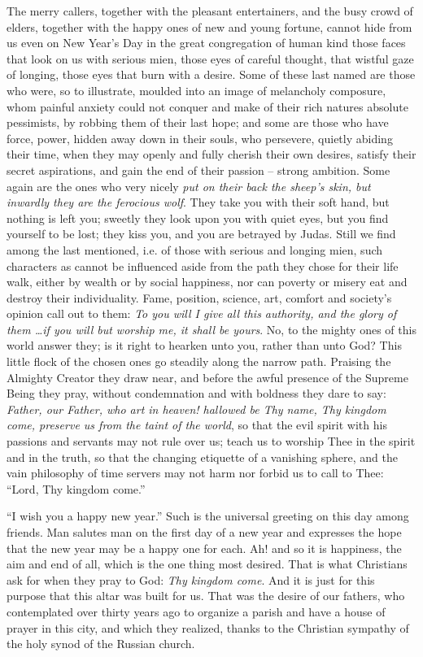 The merry callers, together with the pleasant 
entertainers, and the busy crowd of elders, together
with the happy ones of new and young 
fortune, cannot hide from us even on New 
Year's Day in the great congregation of human 
kind those faces that look on us with serious 
mien, those eyes of careful thought, that wistful
gaze of longing, those eyes that burn with 
a desire. Some of these last named are those 
who were, so to illustrate, moulded into an 
image of melancholy composure, whom painful 
anxiety could not conquer and make of their 
rich natures absolute pessimists, by robbing 
them of their last hope; and some are those 
who have force, power, hidden away down in 
their souls, who persevere, quietly abiding their 
time, when they may openly and fully cherish 
their own desires, satisfy their secret aspirations,
and gain the end of their passion -- strong 
ambition. Some again are the ones who very 
nicely \textit{put on their back the sheep's skin, but 
inwardly they are the ferocious wolf}. They take 
you with their soft hand, but nothing is left 
you; sweetly they look upon you with quiet 
eyes, but you find yourself to be lost; they kiss 
you, and you are betrayed by Judas. Still we 
find among the last mentioned, i.e. of those 
with serious and longing mien, such characters 
as cannot be influenced aside from the path they 
chose for their life walk, either by wealth or by 
social happiness, nor can poverty or misery eat 
and destroy their individuality. Fame, position, 
science, art, comfort and society's opinion call 
out to them: \textit{To you will I give all this authority,
and the glory of them \ldots if you will
but worship me, it shall be yours}. No, to the 
mighty ones of this world answer they; is it 
right to hearken unto you, rather than unto 
God? This little flock of the chosen ones go 
steadily along the narrow path. Praising the 
Almighty Creator they draw near, and before 
the awful presence of the Supreme Being they 
pray, without condemnation and with boldness 
they dare to say: \textit{Father, our Father, who art 
in heaven! hallowed be Thy name, Thy kingdom
come, preserve us from the taint of the 
world}, so that the evil spirit with his passions 
and servants may not rule over us; teach us to 
worship Thee in the spirit and in the truth, 
so that the changing etiquette of a vanishing 
sphere, and the vain philosophy of time servers 
may not harm nor forbid us to call to Thee: 
``Lord, Thy kingdom come.''

``I wish you a happy new year.'' Such is the 
universal greeting on this day among friends. 
Man salutes man on the first day of a new 
year and expresses the hope that the new year 
may be a happy one for each. Ah! and so it is 
happiness, the aim and end of all, which is the 
one thing most desired. That is what Christians
ask for when they pray to God: \textit{Thy 
kingdom come}. And it is just for this purpose
that this altar was built for us. That was the 
desire of our fathers, who contemplated over 
thirty years ago to organize a parish and have 
a house of prayer in this city, and which they 
realized, thanks to the Christian sympathy of 
the holy synod of the Russian church. 

